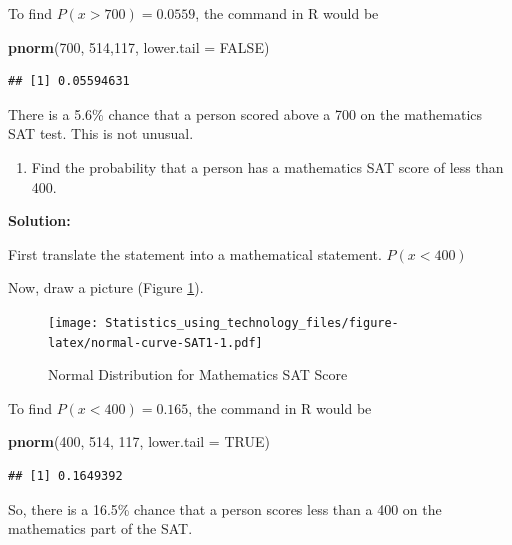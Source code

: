 \documentclass[
]{book}
\newenvironment{Shaded}{\begin{snugshade}}{\end{snugshade}}
\newcommand{\DataTypeTok}[1]{\textcolor[rgb]{0.13,0.29,0.53}{#1}}
\newcommand{\DecValTok}[1]{\textcolor[rgb]{0.00,0.00,0.81}{#1}}
\newcommand{\KeywordTok}[1]{\textcolor[rgb]{0.13,0.29,0.53}{\textbf{#1}}}
\newcommand{\NormalTok}[1]{#1}
\newcommand{\OtherTok}[1]{\textcolor[rgb]{0.56,0.35,0.01}{#1}}
\providecommand{\tightlist}{%
  \setlength{\itemsep}{0pt}\setlength{\parskip}{0pt}}
\begin{document}
To find \(P(x>700)=0.0559\), the command in R would be

\begin{Shaded}
\begin{Highlighting}[]
\KeywordTok{pnorm}\NormalTok{(}\DecValTok{700}\NormalTok{, }\DecValTok{514}\NormalTok{,}\DecValTok{117}\NormalTok{, }\DataTypeTok{lower.tail =} \OtherTok{FALSE}\NormalTok{)}
\end{Highlighting}
\end{Shaded}

\begin{verbatim}
## [1] 0.05594631
\end{verbatim}

There is a 5.6\% chance that a person scored above a 700 on the mathematics SAT test. This is not unusual.

\begin{enumerate}
\def\labelenumi{\alph{enumi}.}
\setcounter{enumi}{2}
\tightlist
\item
  Find the probability that a person has a mathematics SAT score of less than 400.
\end{enumerate}

\textbf{Solution:}

First translate the statement into a mathematical statement. \(P(x<400)\)

Now, draw a picture (Figure \ref{fig:normal-curve-SAT1}).



\begin{figure}
\centering
\texttt{[image: Statistics\_using\_technology\_files/figure-latex/normal-curve-SAT1-1.pdf]}
\caption{\label{fig:normal-curve-SAT1}Normal Distribution for Mathematics SAT Score}
\end{figure}

To find \(P(x<400)=0.165\), the command in R would be

\begin{Shaded}
\begin{Highlighting}[]
\KeywordTok{pnorm}\NormalTok{(}\DecValTok{400}\NormalTok{, }\DecValTok{514}\NormalTok{, }\DecValTok{117}\NormalTok{, }\DataTypeTok{lower.tail =} \OtherTok{TRUE}\NormalTok{)}
\end{Highlighting}
\end{Shaded}

\begin{verbatim}
## [1] 0.1649392
\end{verbatim}

So, there is a 16.5\% chance that a person scores less than a 400 on the mathematics part of the SAT.
\end{document}
